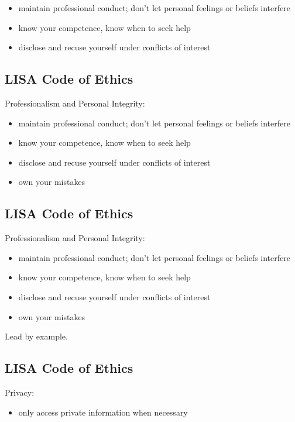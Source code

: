 \documentclass[xga]{xdvislides}
\begin{document}
\begin{itemize}
	\item maintain professional conduct; don't let
personal feelings or beliefs interfere
	\item know your competence, know when to seek help
	\item disclose and recuse yourself under conflicts of interest
\end{itemize}

\subsection{LISA Code of Ethics}
Professionalism and Personal Integrity:

\begin{itemize}
	\item maintain professional conduct; don't let
personal feelings or beliefs interfere
	\item know your competence, know when to seek help
	\item disclose and recuse yourself under conflicts of interest
	\item own your mistakes
\end{itemize}

\subsection{LISA Code of Ethics}
Professionalism and Personal Integrity:

\begin{itemize}
	\item maintain professional conduct; don't let
personal feelings or beliefs interfere
	\item know your competence, know when to seek help
	\item disclose and recuse yourself under conflicts of interest
	\item own your mistakes
\end{itemize}
\vspace{.5in}
Lead by example.

\subsection{LISA Code of Ethics}
Privacy:
\begin{itemize}
	\item only access private information when necessary
\end{itemize}
\end{document}
